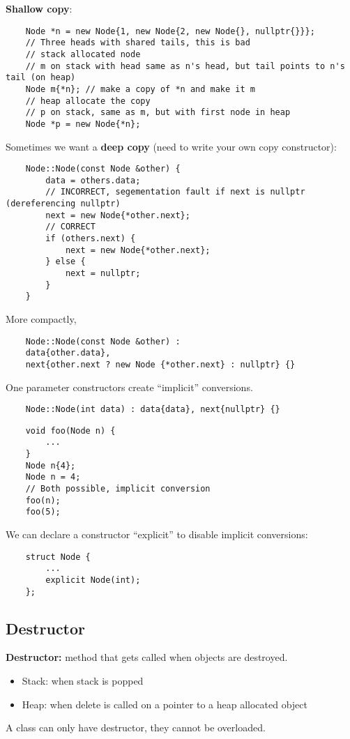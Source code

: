 \textbf{Shallow copy}:
\begin{lstlisting}
    Node *n = new Node{1, new Node{2, new Node{}, nullptr{}}};
    // Three heads with shared tails, this is bad
    // stack allocated node
    // m on stack with head same as n's head, but tail points to n's tail (on heap)
    Node m{*n}; // make a copy of *n and make it m
    // heap allocate the copy
    // p on stack, same as m, but with first node in heap
    Node *p = new Node{*n};
\end{lstlisting}
Sometimes we want a \textbf{deep copy} (need to write your own copy constructor):
\begin{lstlisting}
    Node::Node(const Node &other) {
        data = others.data;
        // INCORRECT, segementation fault if next is nullptr (dereferencing nullptr)
        next = new Node{*other.next};
        // CORRECT
        if (others.next) {
            next = new Node{*other.next};
        } else {
            next = nullptr;
        }
    }
\end{lstlisting}
More compactly,
\begin{lstlisting}
    Node::Node(const Node &other) :
    data{other.data},
    next{other.next ? new Node {*other.next} : nullptr} {}
\end{lstlisting}

One parameter constructors create ``implicit'' conversions.
\begin{lstlisting}
    Node::Node(int data) : data{data}, next{nullptr} {}
\end{lstlisting}

\begin{lstlisting}
    void foo(Node n) {
        ...
    }
    Node n{4};
    Node n = 4;
    // Both possible, implicit conversion
    foo(n);
    foo(5);
\end{lstlisting}
We can declare a constructor ``explicit'' to disable implicit conversions:
\begin{lstlisting}
    struct Node {
        ...
        explicit Node(int);
    };
\end{lstlisting}

\subsection{Destructor}
\textbf{Destructor:} method that gets called when objects are destroyed.
\begin{itemize}
    \item Stack: when stack is popped
    \item Heap: when delete is called on a pointer to a heap allocated object
\end{itemize}
A class can only have  destructor, they cannot be overloaded.

